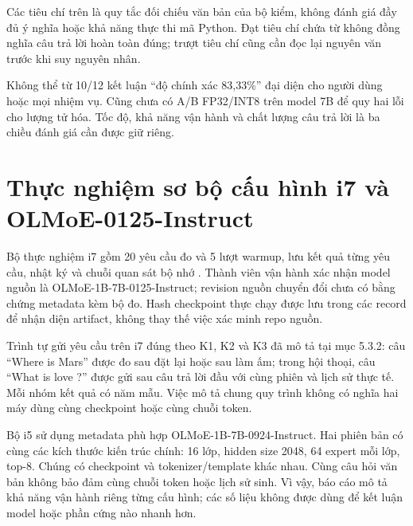 Các tiêu chí trên là quy tắc đối chiếu văn bản của bộ kiểm, không đánh giá đầy đủ ý nghĩa hoặc khả năng thực thi mã Python. Đạt tiêu chí chứa từ không đồng nghĩa câu trả lời hoàn toàn đúng; trượt tiêu chí cũng cần đọc lại nguyên văn trước khi suy nguyên nhân.

Không thể từ 10/12 kết luận “độ chính xác 83,33\%” đại diện cho người dùng hoặc mọi nhiệm vụ. Cũng chưa có A/B FP32/INT8 trên model 7B để quy hai lỗi cho lượng tử hóa. Tốc độ, khả năng vận hành và chất lượng câu trả lời là ba chiều đánh giá cần được giữ riêng.

\section{Thực nghiệm sơ bộ cấu hình i7 và OLMoE-0125-Instruct}

Bộ thực nghiệm i7 gồm 20 yêu cầu đo và 5 lượt warmup, lưu kết quả từng yêu cầu, nhật ký và chuỗi quan sát bộ nhớ \cite{exp_phase1_i7}. Thành viên vận hành xác nhận model nguồn là OLMoE-1B-7B-0125-Instruct; revision nguồn chuyển đổi chưa có bằng chứng metadata kèm bộ đo. Hash checkpoint thực chạy được lưu trong các record để nhận diện artifact, không thay thế việc xác minh repo nguồn.

Trình tự gửi yêu cầu trên i7 đúng theo K1, K2 và K3 đã mô tả tại mục 5.3.2: câu “Where is Mars” được đo sau đặt lại hoặc sau làm ấm; trong hội thoại, câu “What is love ?” được gửi sau câu trả lời đầu với cùng phiên và lịch sử thực tế. Mỗi nhóm kết quả có năm mẫu. Việc mô tả chung quy trình không có nghĩa hai máy dùng cùng checkpoint hoặc cùng chuỗi token.

Bộ i5 sử dụng metadata phù hợp OLMoE-1B-7B-0924-Instruct. Hai phiên bản có cùng các kích thước kiến trúc chính: 16 lớp, hidden size 2048, 64 expert mỗi lớp, top-8. Chúng có checkpoint và tokenizer/template khác nhau. Cùng câu hỏi văn bản không bảo đảm cùng chuỗi token hoặc lịch sử sinh. Vì vậy, báo cáo mô tả khả năng vận hành riêng từng cấu hình; các số liệu không được dùng để kết luận model hoặc phần cứng nào nhanh hơn.

